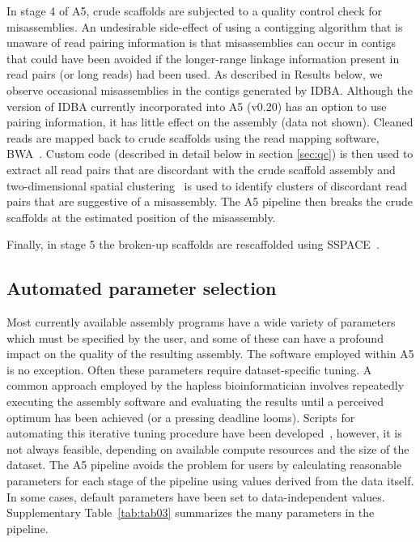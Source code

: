 \documentclass[10pt]{article}
\begin{document}
In stage 4 of A5, crude 
scaffolds are subjected to a quality control check for misassemblies. 
An undesirable side-effect of using a contigging algorithm that is unaware of read pairing information is that misassemblies can occur in contigs 
that could have been avoided if the longer-range linkage information present in read pairs (or long reads) had been used.  As described in Results 
below, we observe occasional misassemblies in the contigs generated by IDBA. Although the version of IDBA currently incorporated into A5 (v0.20) has
an option to use pairing information, it has little effect on the assembly (data not shown). 
Cleaned reads are mapped back to crude scaffolds using the read mapping software,
BWA~\cite{bwa}. Custom code (described in detail below in section \ref{sec:qc}) is then used to extract all read pairs that are discordant with the 
crude scaffold assembly and two-dimensional spatial clustering~\cite{DBSCAN} is used to identify clusters of discordant read pairs that are 
suggestive of a misassembly. The A5 pipeline then breaks the crude scaffolds at the estimated position of the misassembly.

Finally, in stage 5 the broken-up scaffolds are rescaffolded using SSPACE~\cite{Boetzer2011}.

\subsection*{Automated parameter selection}

Most currently available assembly programs have a wide variety of parameters which must
be specified by the user, and some of these can have a profound impact on the quality of the 
resulting assembly. The software employed within A5 is no exception. 
Often these parameters require dataset-specific tuning.  A common approach
employed by the hapless bioinformatician involves repeatedly
executing the assembly software and evaluating the results until a perceived 
optimum has been achieved (or a pressing deadline looms). Scripts for automating this iterative tuning procedure have 
been developed~\cite{VelvetOpt}, however, it is not always feasible, depending on available compute resources and the size 
of the dataset. The A5 pipeline avoids the problem for users by calculating reasonable
parameters for each stage of the pipeline using values derived from the data itself. In some
cases, default parameters have been set to data-independent values. Supplementary Table~\ref{tab:tab03} 
summarizes the many parameters in the pipeline.
\end{document}
